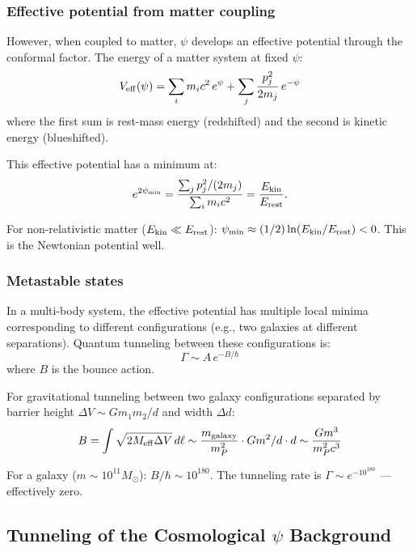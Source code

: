 \documentclass[11pt,a4paper]{article}
\begin{document}
\subsubsection{Effective potential from matter coupling}

However, when coupled to matter, $\psi$ develops an effective potential through the conformal factor. The energy of a matter system at fixed $\psi$:
\begin{equation}
V_{\rm eff}(\psi) = \sum_i m_i c^2\,e^\psi + \sum_j \frac{p_j^2}{2m_j}\,e^{-\psi}
\end{equation}
where the first sum is rest-mass energy (redshifted) and the second is kinetic energy (blueshifted).

This effective potential has a minimum at:
\begin{equation}
e^{2\psi_{\rm min}} = \frac{\sum_j p_j^2/(2m_j)}{\sum_i m_i c^2} = \frac{E_{\rm kin}}{E_{\rm rest}}.
\end{equation}

For non-relativistic matter ($E_{\rm kin} \ll E_{\rm rest}$): $\psi_{\rm min} \approx (1/2)\ln(E_{\rm kin}/E_{\rm rest}) < 0$. This is the Newtonian potential well.

\subsubsection{Metastable states}

In a multi-body system, the effective potential has multiple local minima corresponding to different configurations (e.g., two galaxies at different separations). Quantum tunneling between these configurations is:
\begin{equation}
\Gamma \sim A\,e^{-B/\hbar}
\end{equation}
where $B$ is the bounce action.

For gravitational tunneling between two galaxy configurations separated by barrier height $\Delta V \sim Gm_1 m_2/d$ and width $\Delta d$:
\begin{equation}
B = \int \sqrt{2M_{\rm eff}\Delta V}\,d\ell \sim \frac{m_{\rm galaxy}}{m_P^2}\cdot Gm^2/d \cdot d \sim \frac{Gm^3}{m_P^2 c^3}
\end{equation}

For a galaxy ($m \sim 10^{11} M_\odot$): $B/\hbar \sim 10^{180}$. The tunneling rate is $\Gamma \sim e^{-10^{180}}$ --- effectively zero.

\subsection{Tunneling of the Cosmological $\psi$ Background}
\end{document}
